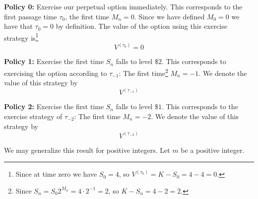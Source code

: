 \documentclass[12pt]{article}
\begin{document}
\begin{adjustwidth}{1cm}{} {\bf Policy 0:} Exercise our perpetual option immediately. This corresponds to the first passage time $\tau_0$, the first time $M_n = 0$. Since we have defined $M_0 = 0$ we have that $\tau_0 = 0$ by definition. The value of the option using this exercise strategy is\footnote{Since at time zero we have $S_0 = 4$, so $V^(\tau_0) = K - S_0 = 4 - 4 = 0$.}
\begin{equation*}
	V^{(\tau_0)} = 0
\end{equation*}
\end{adjustwidth}

\begin{adjustwidth}{1cm}{} {\bf Policy 1:} Exercise the first time $S_n$ falls to level $\$2$. This corresponds to exercising the option according to $\tau_{-1}$: The first time\footnote{Since $S_n = S_0 2^{M_n} = 4\cdot 2^{-1} = 2$, so $K - S_n = 4 - 2 = 2$.} $M_n = -1$. We denote the value of this strategy by
\begin{equation*}
	V^{(\tau_{-1})}
\end{equation*}
\end{adjustwidth}

\begin{adjustwidth}{1cm}{} {\bf Policy 2:} Exercise the first time $S_n$ falls to level $\$1$. This corresponds to the exercise strategy of $\tau_{-2}$: The first time $M_n = -2$. We denote the value of this strategy by
\begin{equation*}
	V^{(\tau_{-2})}
\end{equation*}
\end{adjustwidth}

We may generalize this result for positive integers. Let $m$ be a positive integer. 
\end{document}
